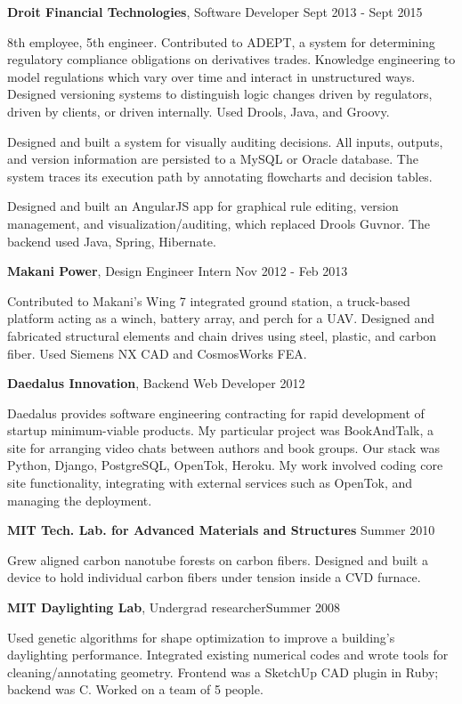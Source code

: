 \documentclass[margin]{res}
\begin{document}
\begin{resume}
		{\bf Droit Financial Technologies}, Software Developer \hfill Sept 2013 - Sept 2015
		
		8th employee, 5th engineer. Contributed to ADEPT, a system for determining regulatory compliance obligations on derivatives trades. Knowledge engineering to model regulations which vary over time and interact in unstructured ways. Designed versioning systems to distinguish logic changes driven by regulators, driven by clients, or driven internally. Used Drools, Java, and Groovy.

		Designed and built a system for visually auditing decisions. All inputs, outputs, and version information are persisted to a MySQL or Oracle database. The system traces its execution path by annotating flowcharts and decision tables.

		Designed and built an AngularJS app for graphical rule editing, version management, and visualization/auditing, which replaced Drools Guvnor. The backend used Java, Spring, Hibernate.
	

		{\bf Makani Power}, Design Engineer Intern \hfill Nov 2012 - Feb 2013

		Contributed to Makani's Wing 7 integrated ground station, a truck-based platform acting as a winch, battery array, and perch for a UAV. Designed and fabricated structural elements and chain drives using steel, plastic, and carbon fiber. Used Siemens NX CAD and CosmosWorks FEA.


		{\bf Daedalus Innovation}, Backend Web Developer \hfill 2012

		Daedalus provides software engineering contracting for rapid development of startup minimum-viable products. My particular project was BookAndTalk, a site for arranging video chats between authors and book groups. Our stack was Python, Django, PostgreSQL, OpenTok, Heroku. My work involved coding core site functionality, integrating with external services such as OpenTok, and managing the deployment. 


		{\bf MIT Tech. Lab. for Advanced Materials and Structures}  \hfill Summer 2010

		Grew aligned carbon nanotube forests on carbon fibers. Designed and built a device to hold individual carbon fibers under tension inside a CVD furnace.


		{\bf MIT Daylighting Lab}, Undergrad researcher\hfill Summer 2008

		Used genetic algorithms for shape optimization to improve a building's daylighting performance. Integrated existing numerical codes and wrote tools for cleaning/annotating geometry. Frontend was a SketchUp CAD plugin in Ruby; backend was C. Worked on a team of 5 people.


\end{resume}
\end{document}
